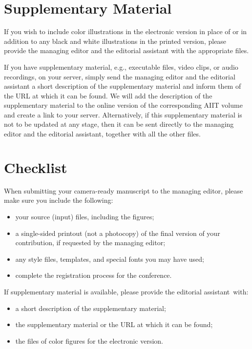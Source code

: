 \documentclass[runningheads]{AIIT}
\begin{document}
\section{Supplementary Material}

If you wish to include color illustrations in the electronic version in place
of or in addition to any black and white illustrations in the printed version,
please provide the managing editor and the editorial assistant with the
appropriate files.

If you have supplementary material, e.g., executable files, video clips, or
audio recordings, on your server, simply send the managing editor and the
editorial assistant a short description of the supplementary material and
inform them of the URL at which it can be found. We will add the description
of the supplementary material to the online version of the corresponding
AIIT volume and create a link to your server. Alternatively, if this
supplementary material is not to be updated at any stage, then it can be sent
directly to the managing editor and the editorial assistant, together with all
the other files.


\section{Checklist}

When submitting your camera-ready manuscript to the managing editor, please make sure you include the following:
\begin{itemize}
  \item your source (input) files, including the figures;
  \item a single-sided printout (not a photocopy) of the final version of your contribution, if requested by the managing editor;
  \item any style files, templates, and special fonts you may have used;
  \item complete the registration process for the conference.
\end{itemize}

If supplementary material is available, please provide the editorial
assistant~with:
\begin{itemize}
  \item a short description of the supplementary material;
  \item the supplementary material or the URL at which it can be found;
  \item the files of color figures for the electronic version.
\end{itemize}

\nocite{Temporal97TDS,CS95,Ontology02}



\end{document}
